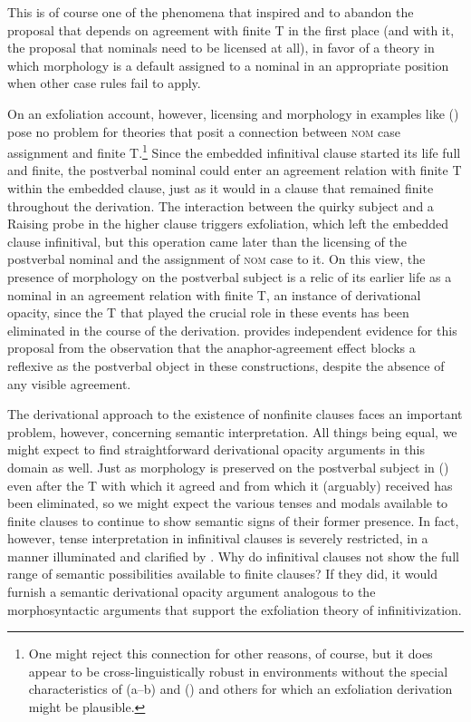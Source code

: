 \documentclass[output=paper]{langscibook}
\begin{document}
\noindent This is of course one of the phenomena that inspired \citet{Yip1987a} and \citet{Marantz1991} to abandon the proposal that \Nom{} depends on agreement with finite T in the first place (and with it, the proposal that nominals need to be licensed at all), in favor of a theory in which \Nom{} morphology is a default assigned to a nominal in an appropriate position when other case rules fail to apply. 

On an exfoliation account, however, licensing and \Nom{} morphology in examples like () pose no problem for theories that posit a connection between \textsc{nom} case assignment and finite T.\footnote{One might reject this connection for other reasons, of course, but it does appear to be cross-linguistically robust in environments without the special characteristics of (a--b) and () and others for which an exfoliation derivation might be plausible.} Since the embedded infinitival clause started its life full and finite, the postverbal nominal could enter an agreement relation with finite T within the embedded clause, just as it would in a clause that remained finite throughout the derivation. The interaction between the quirky subject and a Raising probe in the higher clause triggers exfoliation, which left the embedded clause infinitival, but this operation came later than the licensing of the postverbal nominal and the assignment of \textsc{nom} case to it. On this view, the presence of \Nom{} morphology on the postverbal subject is a relic of its earlier life as a nominal in an agreement relation with finite T, an instance of derivational opacity, since the T that played the crucial role in these events has been eliminated in the course of the derivation. \citet{Pesetsky:2019aa} provides independent evidence for this proposal from the observation that the anaphor-agreement effect blocks a reflexive as the postverbal object in these constructions, despite the absence of any visible agreement.

The derivational approach to the existence of nonfinite clauses faces an important problem, however, concerning semantic interpretation. All things being equal, we might expect to find straightforward derivational opacity arguments in this domain as well. Just as \Nom{} morphology is preserved on the postverbal subject in () even after the T with which it agreed and from which it (arguably) received \Nom{} has been eliminated, so we might expect the various tenses and modals available to finite clauses to continue to show semantic signs of their former presence. In fact, however, tense interpretation in infinitival clauses is severely restricted, in a manner illuminated and clarified by \citet{Wurmbrand:2014aa}. Why do infinitival clauses not show the full range of semantic possibilities available to finite clauses? If they did, it would furnish a semantic derivational opacity argument analogous to the morphosyntactic arguments that support the exfoliation theory of infinitivization.
\end{document}
